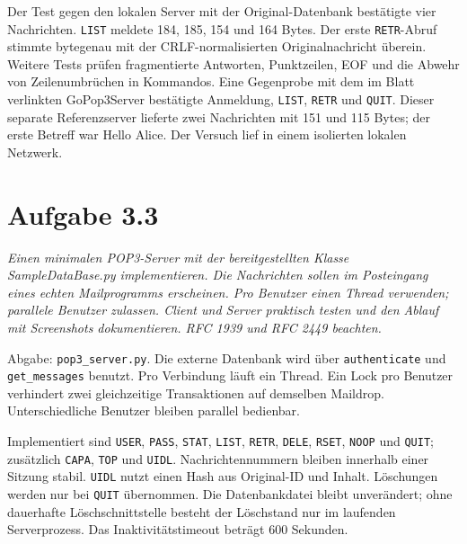 \documentclass[a4paper,11pt]{article}
\newif\ifexplain
\newcommand{\aufgabe}[1]{\section*{Aufgabe #1}}
\newcommand{\angabe}[1]{\textit{#1}\par\smallskip}
\newcommand{\explain}[1]{\ifexplain\begin{erklbox}#1\end{erklbox}\fi}
\begin{document}
Der Test gegen den lokalen Server mit der Original-Datenbank bestätigte vier Nachrichten. \texttt{LIST} meldete 184, 185, 154 und 164 Bytes. Der erste \texttt{RETR}-Abruf stimmte bytegenau mit der CRLF-normalisierten Originalnachricht überein. Weitere Tests prüfen fragmentierte Antworten, Punktzeilen, EOF und die Abwehr von Zeilenumbrüchen in Kommandos.
Eine Gegenprobe mit dem im Blatt verlinkten GoPop3Server bestätigte Anmeldung, \texttt{LIST}, \texttt{RETR} und \texttt{QUIT}. Dieser separate Referenzserver lieferte zwei Nachrichten mit 151 und 115 Bytes; der erste Betreff war \glqq Hello Alice\grqq. Der Versuch lief in einem isolierten lokalen Netzwerk.
\explain{Die Größen beziehen sich auf die Nachricht mit CRLF, nicht auf Statuszeilen, zusätzliche Punkte oder die abschließende Punktzeile. Der Vergleich mit den Originalbytes prüft daher eine andere Eigenschaft als ein bloßer Vergleich des sichtbaren Mailtexts.}

\aufgabe{3.3}
\angabe{Einen minimalen POP3-Server mit der bereitgestellten Klasse SampleDataBase.py implementieren. Die Nachrichten sollen im Posteingang eines echten Mailprogramms erscheinen. Pro Benutzer einen Thread verwenden; parallele Benutzer zulassen. Client und Server praktisch testen und den Ablauf mit Screenshots dokumentieren. RFC 1939 und RFC 2449 beachten.}

Abgabe: \texttt{pop3\_server.py}. Die externe Datenbank wird über \texttt{authenticate} und \texttt{get\_messages} benutzt. Pro Verbindung läuft ein Thread. Ein Lock pro Benutzer verhindert zwei gleichzeitige Transaktionen auf demselben Maildrop. Unterschiedliche Benutzer bleiben parallel bedienbar.
\explain{Die Threads gehören zu Verbindungen, nicht dauerhaft zu Konten. Wenn sich derselbe Benutzer später erneut verbindet, übernimmt ein neuer Sitzungsthread die Bearbeitung, während der gemeinsame Benutzer-Lock weiterhin verhindert, dass zwei gleichzeitig angemeldete Sitzungen widersprüchliche Löschungen am selben Maildrop vornehmen. Das Annehmen weiterer Verbindungen bleibt davon getrennt.}

Implementiert sind \texttt{USER}, \texttt{PASS}, \texttt{STAT}, \texttt{LIST}, \texttt{RETR}, \texttt{DELE}, \texttt{RSET}, \texttt{NOOP} und \texttt{QUIT}; zusätzlich \texttt{CAPA}, \texttt{TOP} und \texttt{UIDL}. Nachrichtennummern bleiben innerhalb einer Sitzung stabil. \texttt{UIDL} nutzt einen Hash aus Original-ID und Inhalt. Löschungen werden nur bei \texttt{QUIT} übernommen. Die Datenbankdatei bleibt unverändert; ohne dauerhafte Löschschnittstelle besteht der Löschstand nur im laufenden Serverprozess. Das Inaktivitätstimeout beträgt 600 Sekunden.
\explain{\texttt{DELE} entfernt zunächst keine Datei. Die Sitzung merkt sich nur die Nummer. Erst beim Wechsel nach UPDATE wird die ursprüngliche Datenbank-ID in den lokalen Löschstand geschrieben. Dadurch kann ein abgebrochener Download keine bereits markierten Nachrichten versehentlich entfernen.}
\end{document}
